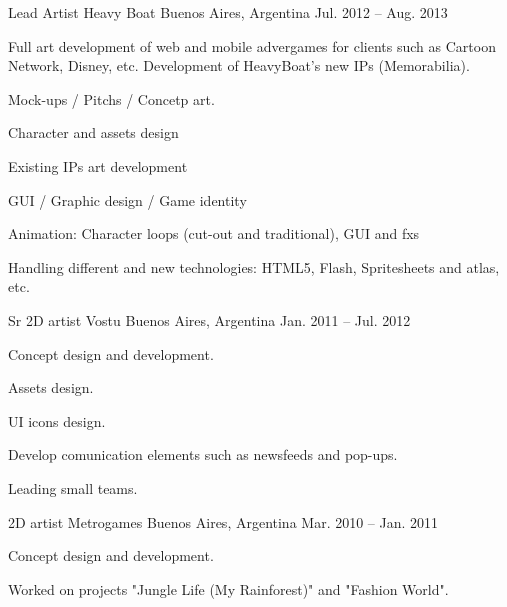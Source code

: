 \begin{cventries}
  \cventry
    {Lead Artist} %
    {Heavy Boat} %
    {Buenos Aires, Argentina} %
    {Jul. 2012 – Aug. 2013} %
    {
      \begin{cvitems} %
       \item {Full art development of web and mobile advergames for clients such as Cartoon Network, Disney, etc. Development of HeavyBoat's new IPs (Memorabilia).}
       \item {Mock-ups / Pitchs / Concetp art.}
       \item {Character and assets design}
       \item {Existing IPs art development}
       \item {GUI / Graphic design / Game identity}
       \item {Animation: Character loops (cut-out and traditional), GUI and fxs}
       \item {Handling different and new technologies: HTML5, Flash, Spritesheets and atlas, etc.}
      \end{cvitems}
    }
  \cventry
    {Sr 2D artist} %
    {Vostu} %
    {Buenos Aires, Argentina} %
    {Jan. 2011 – Jul. 2012 } %
    {
      \begin{cvitems} %
        \item {Concept design and development.}
        \item {Assets design.}
        \item {UI icons design.}
        \item {Develop comunication elements such as newsfeeds and pop-ups.}
        \item {Leading small teams.}
      \end{cvitems}
    }
  \cventry
    {2D artist} %
    {Metrogames} %
    {Buenos Aires, Argentina} %
    {Mar. 2010 – Jan. 2011} %
    {
      \begin{cvitems} %
        \item {Concept design and development.}
        \item {Worked on projects "Jungle Life (My Rainforest)" and "Fashion World".}
      \end{cvitems}
}
\end{cventries}

